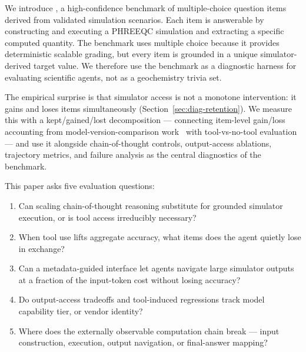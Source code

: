 \documentclass{article}
\begin{document}
We introduce \BenchName, a high-confidence benchmark of \BenchN{} multiple-choice question items derived from \BenchScenarioN{} validated simulation scenarios. Each item is answerable by constructing and executing a PHREEQC simulation and extracting a specific computed quantity. The benchmark uses multiple choice because it provides deterministic scalable grading, but every item is grounded in a unique simulator-derived target value. We therefore use the benchmark as a diagnostic harness for evaluating scientific agents, not as a geochemistry trivia set.

The empirical surprise is that simulator access is not a monotone intervention: it gains and loses items simultaneously (Section~\ref{sec:diag-retention}). We measure this with a kept/gained/lost decomposition --- connecting item-level gain/loss accounting from model-version-comparison work~\citep{rci2026} with tool-vs-no-tool evaluation --- and use it alongside chain-of-thought controls, output-access ablations, trajectory metrics, and failure analysis as the central diagnostics of the benchmark.

This paper asks five evaluation questions:
\begin{enumerate}[leftmargin=*, itemsep=2pt]
    \item Can scaling chain-of-thought reasoning substitute for grounded simulator execution, or is tool access irreducibly necessary?
    \item When tool use lifts aggregate accuracy, what items does the agent quietly lose in exchange?
    \item Can a metadata-guided interface let agents navigate large simulator outputs at a fraction of the input-token cost without losing accuracy?
    \item Do output-access tradeoffs and tool-induced regressions track model capability tier, or vendor identity?
    \item Where does the externally observable computation chain break --- input construction, execution, output navigation, or final-answer mapping?
\end{enumerate}
\end{document}
